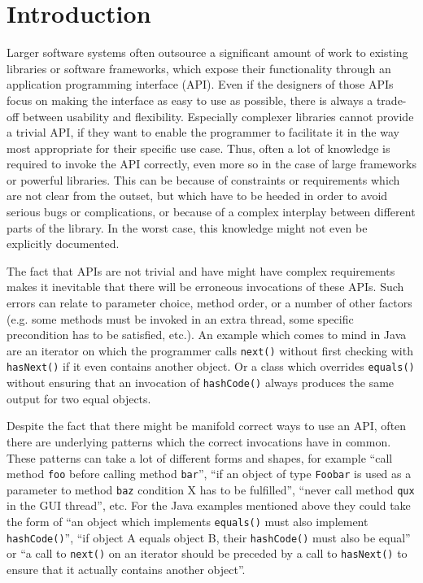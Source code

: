 \chapter{Introduction}\label{chapter:introduction}

Larger software systems often outsource a significant amount of work to existing libraries or software frameworks, which expose their functionality through an application programming interface (API).
Even if the designers of those APIs focus on making the interface as easy to use as possible, there is always a trade-off between usability and flexibility.
Especially complexer libraries cannot provide a trivial API, if they want to enable the programmer to facilitate it in the way most appropriate for their specific use case.
Thus, often a lot of knowledge is required to invoke the API correctly, even more so in the case of large frameworks or powerful libraries.
This can be because of constraints or requirements which are not clear from the outset, but which have to be heeded in order to avoid serious bugs or complications, or because of a complex interplay between different parts of the library.
In the worst case, this knowledge might not even be explicitly documented.

The fact that APIs are not trivial and have might have complex requirements makes it inevitable that there will be erroneous invocations of these APIs.
Such errors can relate to parameter choice, method order, or a number of other factors (e.g. some methods must be invoked in an extra thread, some specific precondition has to be satisfied, etc.).
An example which comes to mind in Java are an iterator on which the programmer calls \texttt{next()} without first checking with \texttt{hasNext()} if it even contains another object.
Or a class which overrides \texttt{equals()} without ensuring that an invocation of \texttt{hashCode()} always produces the same output for two equal objects.

Despite the fact that there might be manifold correct ways to use an API, often there are underlying patterns which the correct invocations have in common.
These patterns can take a lot of different forms and shapes, for example ``call method \texttt{foo} before calling method \texttt{bar}'', ``if an object of type \texttt{Foobar} is used as a parameter to method \texttt{baz} condition X has to be fulfilled'', ``never call method \texttt{qux} in the GUI thread'', etc.
For the Java examples mentioned above they could take the form of ``an object which implements \texttt{equals()} must also implement \texttt{hashCode()}'', ``if object A equals object B, their \texttt{hashCode()} must also be equal'' or ``a call to \texttt{next()} on an iterator should be preceded by a call to \texttt{hasNext()} to ensure that it actually contains another object''.

